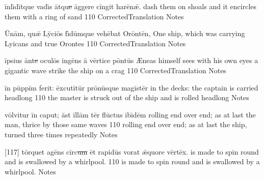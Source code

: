 \latline
  {\=inl\={\macron \i}d\=itqu\-e v\-ad\={\macron \i}s \=atqu\sout{e }\=agg\-er\-e c\=ing\-it h\-ar\={\macron e}n\={\ae}.}
  { dash them on shoals and it encircles them  with a ring of sand }
  {110}
  { CorrectedTranslation }
  { Notes }


\newpage

\latline
  {\={\macron U}n\=am, qu\={\ae} L\=yci\={\macron o}s f\={\macron \i}d\=umqu\-e v\-eh\={\macron e}b\-at \-Or\=ont\={\macron e}n,}
  { One ship, which was carrying Lyicans and true Orontes }
  {110}
  { CorrectedTranslation }
  { Notes }


\latline
  {\=ips\-i\-us \=ant\sout{e }\-oc\-ul\={\macron o}s ing\={\macron e}ns \={\macron a} v\=ert\-ic\-e p\=ont\=us}
  { {\AE}neas himself sees with his own eyes a gigantic wave strike the ship on a crag  }
  {110}
  { CorrectedTranslation }
  { Notes }


\latline
  {\=in p\=upp\=im fe\-r\-it:  \=exc\-ut\-it\=ur pr\={\macron o}n\=usqu\-e m\-ag\=ist\=er}
  { in the decks: the captain is carried headlong }
  {110}
  { the master is struck out of the ship and is rolled headlong }
  { Notes }


\newpage

\latline
  {v\=olv\-it\-ur \=in c\-ap\-ut; \=ast \=ill\=am t\=er fl\={\macron u}ct\-us \-ib\={\macron \i}d\=em}
  { rolling end over end; as at last the man, thrice by those same waves  }
  {110}
  { rolling end over end; as at last the ship,  turned three times repeatedly }
  { Notes }


\latline
  {[117] t\=orqu\-et \-ag\={\macron e}ns c\=irc\sout{um }\=et r\-ap\-id\=us v\-or\-at \={\ae}qu\-or\-e v\=ert\=ex.}
  { is made to spin round and is swallowed by a whirlpool. }
  {110}
  { is made to spin round and is swallowed by a whirlpool. }
  { Notes }
